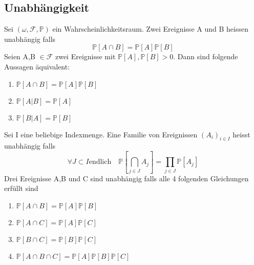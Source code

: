 \subsection{Unabhängigkeit}
\Def[1.18 Unabhängigkeit] \newline
Sei \( (\omega, \mathcal{F}, \mathbb{P})\) ein Wahrscheinlichkeitsraum. Zwei Ereignisse A und B heissen unabhängig falls \[ \mathbb{P} \left[A \cap B \right] = \mathbb{P}\left[A\right] \mathbb{P} \left[B\right]\]
\Satz[1.20] \newline
Seien A,B \( \in \mathcal{F}\) zwei Ereignisse mit \( \mathbb{P}[A], \mathbb{P}[B] > 0 \). Dann sind folgende Aussagen äquivalent:
\begin{enumerate}
    \item \( \mathbb{P}[A \cap B] = \mathbb{P}[A] \mathbb{P}[B]\)
    \item \( \mathbb{P}[A | B] = \mathbb{P}[A]\)
    \item \( \mathbb{P}[B | A] = \mathbb{P}[B]\)
\end{enumerate}
\Def[1.21]  \newline
Sei I eine beliebige Indexmenge. Eine Familie von Ereignissen \( (A_i)_{i \in I}\) heisst unabhängig falls \[ \forall J \subset I \text{endlich} \quad \mathbb{P}[\bigcap_{j \in J}A_j] = \prod_{j \in J} \mathbb{P}[A_j]\]
\Bem \newline
Drei Ereignisse A,B und C sind unabhängig falls alle 4 folgenden Gleichungen erfüllt sind
\begin{enumerate}
    \item \( \mathbb{P}[A \cap B ] = \mathbb{P}[A] \mathbb{P}[B]\)
    \item \( \mathbb{P}[A \cap C ] = \mathbb{P}[A] \mathbb{P}[C]\)
    \item \( \mathbb{P}[B \cap C ] = \mathbb{P}[B] \mathbb{P}[C]\)
    \item \( \mathbb{P}[A \cap B \cap C  ] = \mathbb{P}[A] \mathbb{P}[B] \mathbb{P}[C]\)
\end{enumerate}